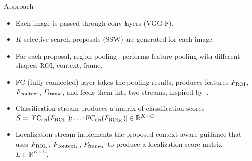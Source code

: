 \documentclass[final, xcolor={dvipsnames}]{beamer}
\begin{document}
\begin{frame}[t,fragile]{}
\begin{mdframed}[style = posterframe]
\begin{columns}[t,onlytextwidth]
\begin{column}{.44\linewidth}
	\begin{block}{Approach}
		\def \columnsizemodel {.35\linewidth}
		\def \columnsizedescr {.65\linewidth}
		\def \increaseitemsep {\setlength\itemsep{1cm}}
		\def \modelsep {\bigskip\bigskip\bigskip}
		
		
		\begin{itemize}
			\increaseitemsep
			\item Each image is passed through \colorbox{color_conv_fc}{conv layers} (VGG-F).
			\item $K$ selective search proposals (SSW) are generated for each image.
			\item For each proposal, \colorbox{color_region_pooling}{region pooling}~\cite{Gidaris:2015cx} performs feature pooling with different shapes: ROI, context, frame. 	
			\end{itemize}
		
		\bigskip\bigskip
		\begin{itemize}
			\increaseitemsep
			\item \colorbox{color_conv_fc}{FC} (fully-connected) layer takes the pooling results,  produces features $F_{\rm ROI}$, $F_{\rm context}$, $F_{\rm frame}$, and feeds them into two streams, inspired by~\cite{Bilen:2015uo}.
			\item \colorbox{color_classification_stream}{Classification stream} produces a matrix of classification scores $S = [{\rm FC_{cls}}(F_{\rm ROI_1}); \dots; {\rm FC_{cls}}(F_{\rm ROI_K})] \in \mathbb{R}^{K \times C}$
			\item \colorbox{color_localization_stream}{Localization stream} implements the proposed context-aware guidance that uses $F_{\rm ROI_k}$, $F_{\rm context_k}$, $F_{\rm frame_k}$ to produce a localization score matrix $L \in \mathbb{R}^{K \times C}$.
		\end{itemize}
		

\end{block}
\end{column}
\end{columns}
\end{mdframed}
\end{frame}
\end{document}
